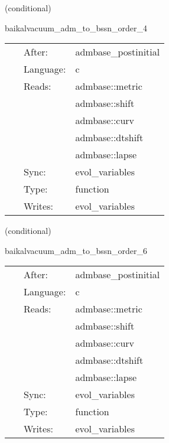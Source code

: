 \vspace{5mm}

   (conditional) 

\hspace{5mm} baikalvacuum\_adm\_to\_bssn\_order\_4 

\hspace{5mm}{\it convert initial data into bssn variables } 


\hspace{5mm}

 \begin{tabular*}{160mm}{cll} 
~ & After:  & admbase\_postinitial \\ 
~ & Language:  & c \\ 
~ & Reads:  & admbase::metric \\ 
~& ~ &admbase::shift\\ 
~& ~ &admbase::curv\\ 
~& ~ &admbase::dtshift\\ 
~& ~ &admbase::lapse\\ 
~ & Sync:  & evol\_variables \\ 
~ & Type:  & function \\ 
~ & Writes:  & evol\_variables \\ 
\end{tabular*} 


\vspace{5mm}

   (conditional) 

\hspace{5mm} baikalvacuum\_adm\_to\_bssn\_order\_6 

\hspace{5mm}{\it convert initial data into bssn variables } 


\hspace{5mm}

 \begin{tabular*}{160mm}{cll} 
~ & After:  & admbase\_postinitial \\ 
~ & Language:  & c \\ 
~ & Reads:  & admbase::metric \\ 
~& ~ &admbase::shift\\ 
~& ~ &admbase::curv\\ 
~& ~ &admbase::dtshift\\ 
~& ~ &admbase::lapse\\ 
~ & Sync:  & evol\_variables \\ 
~ & Type:  & function \\ 
~ & Writes:  & evol\_variables \\ 
\end{tabular*} 


